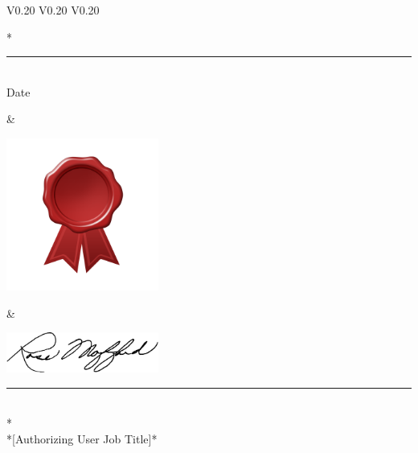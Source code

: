\documentclass{article}
\begin{document}
\setlength{\tabcolsep}{12pt}
\begin{table}[h]
  \centering
  \begin{tabular} {V{0.20\paperwidth} V{0.20\paperwidth} V{0.20\paperwidth} }       
    \vspace{0pt}\parbox[b][1cm][b]{5cm}{\huge\selectfont {}* \\
    \rule{5cm}{0.4pt} \\
    \normalsize\selectfont \centering Date \\
    \phantom{Date}}                                                            &   
    \vspace{0pt}\parbox[b][1cm][c]{5cm}{\includegraphics[width=5cm]{images/redribbon}} &   
    \vspace{0pt}\parbox[b][1cm][b]{5cm}{\includegraphics[width=5cm]{images/rose_mofford_signature} \\
    \rule{5cm}{0.4pt} \\
    \normalsize\selectfont {}* \\
    *[Authorizing User Job Title]*}
  \end{tabular}
\end{table}
\end{document}
